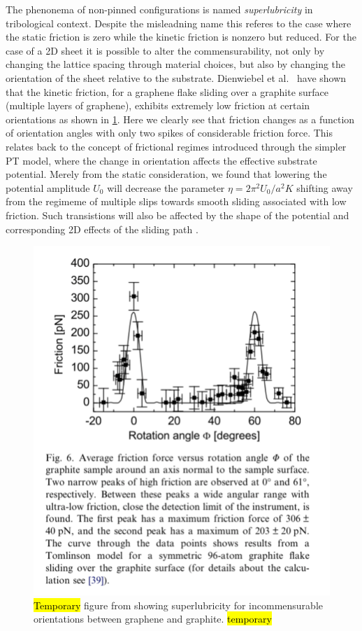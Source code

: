 The phenonema of non-pinned configurations is named \textit{superlubricity} in
tribological context. Despite the misleadning name this referes to the case
where the static friction is zero while the kinetic friction is nonzero but
reduced. For the case of a 2D sheet it is possible to alter the
commensurability, not only by changing the lattice spacing through material
choices, but also by changing the orientation of the sheet relative to the
substrate. Dienwiebel et al.\ \cite{DIENWIEBEL2005197} have shown that the
kinetic friction, for a graphene flake sliding over a graphite surface (multiple
layers of graphene), exhibits extremely low friction at certain orientations as
shown in \cref{fig:graphene_rot}. Here we clearly see that friction changes as a
function of orientation angles with only two spikes of considerable friction
force. This relates back to the concept of frictional regimes introduced through
the simpler \acrshort{PT} model, where the change in orientation affects the
effective substrate potential. Merely from the static consideration, we found that
lowering the potential amplitude $U_0$ will decrease the parameter $\eta =
2\pi^2U_0/a^2K$ shifting away from the regimeme of multiple slips towards smooth
sliding associated with low friction. Such transistions will also be affected by the shape of the
potential and corresponding 2D effects of the sliding path \cite{Yalin_2011}.

\begin{figure}[H]
  \centering
  \includegraphics[width=0.5\linewidth]{figures/theory/graphene_rot.png}
  \caption{\hl{Temporary} figure from \cite{DIENWIEBEL2005197} showing superlubricity for incommensurable orientations between graphene and graphite. \hl{temporary}}
  \label{fig:graphene_rot}
\end{figure}





